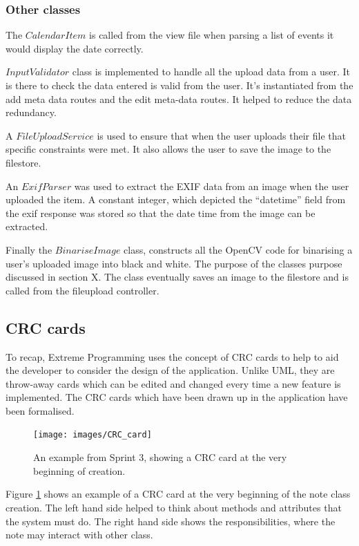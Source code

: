 \subsubsection{Other classes}
The $CalendarItem$ is called from the view file when parsing a list of events it would display the date correctly.

$InputValidator$ class is implemented to handle all the upload data from a user. It is there to check the data entered is valid from the user. It's instantiated from the add meta data routes and the edit meta-data routes. It helped to reduce the data redundancy.

A $FileUploadService$ is used to ensure that when the user uploads their file that specific constraints were met. It also allows the user to save the image to the filestore.

An $ExifParser$ was used to extract the EXIF data from an image when the user uploaded the item. A constant integer, which depicted the ``datetime'' field from the exif response was stored so that the date time from the image can be extracted.

Finally the $BinariseImage$ class, constructs all the OpenCV code for binarising a user's uploaded image into black and white. The purpose of the classes purpose discussed in section X. The class eventually saves an image to the filestore and is called from the fileupload controller.


\subsection{CRC cards}
To recap, Extreme Programming uses the concept of CRC cards to help to aid the developer to consider the design of the application. Unlike UML, they are throw-away cards which can be edited and changed every time a new feature is implemented. The CRC cards which have been drawn up in the application have been formalised.

\begin{figure}[h]
  \centering
  \texttt{[image: images/CRC\_card]}
  \caption{An example from Sprint 3, showing a CRC card at the very beginning of creation.}
  \label{fig:crc1}
\end{figure}

Figure \ref{fig:crc1} shows an example of a CRC card at the very beginning of the note class creation. The left hand side helped to think about methods and attributes that the system must do. The right hand side shows the responsibilities, where the note may interact with other class.

